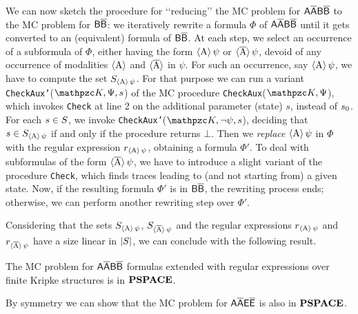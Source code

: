 We can now sketch the procedure for \lq\lq reducing\rq\rq{} the MC problem for $\mathsf{A\overline{A}B\overline{B}}$ to the MC problem for $\mathsf{B}\mathsf{\overline{B}}$: we iteratively rewrite a formula $\Phi$ of $\mathsf{A\overline{A}B\overline{B}}$ until it gets converted to an (equivalent) formula of $\mathsf{B}\mathsf{\overline{B}}$.
At each step, we select an occurrence of a subformula of $\Phi$, either having the form $\operatorname{\langle A\rangle}\psi$ or $\operatorname{\langle \overline{A}\rangle}\psi$, devoid of any  occurrence of modalities $\operatorname{\langle A\rangle}$ and $\operatorname{\langle \overline{A}\rangle}$ in $\psi$. For such an occurrence, say $\operatorname{\langle A\rangle}\psi$, we have to compute the set $S_{\operatorname{\langle A\rangle}\psi}$. For that purpose we can run a variant \texttt{CheckAux'}($\Ku,\Psi,s$) of the MC procedure \texttt{CheckAux}($\Ku,\Psi$), which invokes \texttt{Check} at line 2 on the additional parameter (state) $s$, instead of $s_0$. 
For each $s \in S$, we invoke \texttt{CheckAux'}($\Ku,\neg\psi,s$), deciding that $s\in S_{\operatorname{\langle A\rangle}\psi}$ if and only if the procedure returns $\bot$.
%
Then we \emph{replace} $\operatorname{\langle A\rangle}\psi$ in $\Phi$ with the regular expression $r_{\operatorname{\langle A\rangle}\psi}$, obtaining  a formula $\Phi'$. To deal with subformulas of the form $\operatorname{\langle \overline{A}\rangle}\psi$, we have to introduce a slight variant of the procedure \texttt{Check}, which finds traces leading to (and not starting from) a given state.
Now, if the resulting formula $\Phi'$ is in $\mathsf{B}\mathsf{\overline{B}}$, the rewriting process ends; otherwise, we can perform another rewriting step over $\Phi'$.
 
Considering that the sets  $S_{\operatorname{\langle A\rangle}\psi}$, $S_{\operatorname{\langle \overline{A}\rangle}\psi}$ and the regular expressions $r_{\operatorname{\langle A\rangle}\psi}$ and $r_{\operatorname{\langle \overline{A}\rangle}\psi}$ have a size linear in $|S|$, we can conclude with the following result.

\begin{theorem}\label{th:ABBA}
The MC problem for $\mathsf{A\overline{A}B\overline{B}}$ formulas extended with regular expressions over finite Kripke structures is in $\textbf{PSPACE}$.
\end{theorem}

By symmetry we can show that the MC problem for $\mathsf{A}\mathsf{\overline{A}}\mathsf{E}\mathsf{\overline{E}}$ is also in $\textbf{PSPACE}$.
